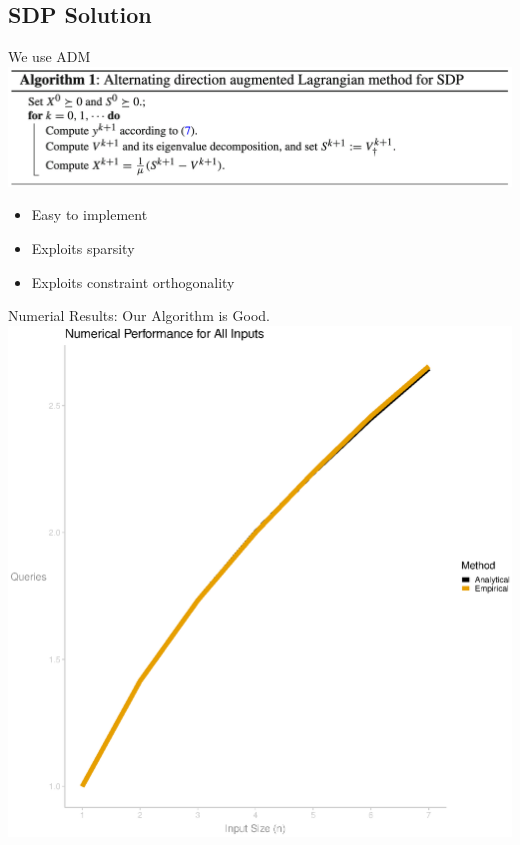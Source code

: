 \documentclass[12pt]{beamer}
\begin{document}
\subsection{SDP Solution}
\begin{frame}{We use ADM \cite{adm}}
\centering
\includegraphics[scale=.15]{figures/adm_algorithm}
\bigskip
\begin{itemize}
    \item Easy to implement
    \item Exploits sparsity
    \item Exploits constraint orthogonality
\end{itemize}
\end{frame}

\begin{frame}{Numerial Results: Our Algorithm is Good.}
\centering
\includegraphics[scale=.5]{figure_all_or_complexity.eps}
\end{frame}
\end{document}
